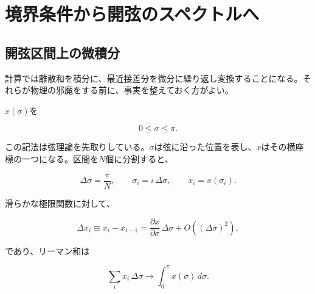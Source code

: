 \chapter{境界条件から開弦のスペクトルへ}


\section{開弦区間上の微積分}

計算では離散和を積分に、最近接差分を微分に繰り返し変換することになる。それらが物理の邪魔をする前に、事実を整えておく方がよい。

\(x(\sigma)\)を

\begin{equation}
  0\leq \sigma\leq \pi .
\end{equation}

この記法は弦理論を先取りしている。\(\sigma\)は弦に沿った位置を表し、\(x\)はその横座標の一つになる。区間を\(N\)個に分割すると、

\begin{equation}
  \Delta\sigma=\frac{\pi}{N},
  \qquad
  \sigma_i=i\,\Delta\sigma,
  \qquad
  x_i=x(\sigma_i).
  \label{eq:l02-lattice}
\end{equation}

滑らかな極限関数に対して、

\begin{equation}
  \Delta x_i\equiv x_i-x_{i-1}
  =
  \frac{\partial x}{\partial\sigma}\,\Delta\sigma
  +O\!\left((\Delta\sigma)^2\right),
  \label{eq:l02-difference}
\end{equation}

であり、リーマン和は

\begin{equation}
  \sum_i x_i\,\Delta\sigma
  \longrightarrow
  \int_0^\pi x(\sigma)\,d\sigma .
  \label{eq:l02-riemann}
\end{equation}

